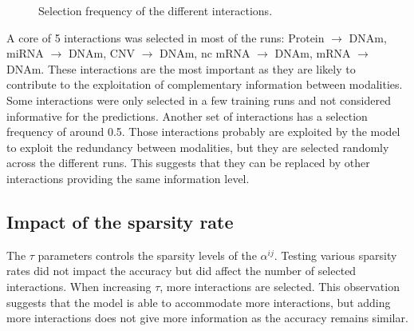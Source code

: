 \documentclass[../main.tex]{subfiles}
\begin{document}
		\begin{figure}
			\centering
			\vspace{-0.5\intextsep}
			\caption{Selection frequency of the different interactions.}
			\label{fig:alphas_stability}
		\end{figure}
		A core of 5 interactions was selected in most of the runs: Protein \(\rightarrow\) DNAm, miRNA \(\rightarrow\) DNAm, CNV \(\rightarrow\) DNAm, nc mRNA \(\rightarrow\) DNAm, mRNA \(\rightarrow\) DNAm.
		These interactions are the most important as they are likely to contribute to the exploitation of complementary information between modalities.
		Some interactions were only selected in a few training runs and not considered informative for the predictions.
		Another set of interactions has a selection frequency of around 0.5.
		Those interactions probably are exploited by the model to exploit the redundancy between modalities, but they are selected randomly across the different runs.
		This suggests that they can be replaced by other interactions providing the same information level.


	\subsection{Impact of the sparsity rate}

		The \(\tau\) parameters controls the sparsity levels of the \(\alpha^{ij}\).
		Testing various sparsity rates did not impact the accuracy but did affect the number of selected interactions.
		When increasing \(\tau\), more interactions are selected.
		This observation suggests that the model is able to accommodate more interactions, but adding more interactions does not give more information as the accuracy remains similar.
\end{document}
